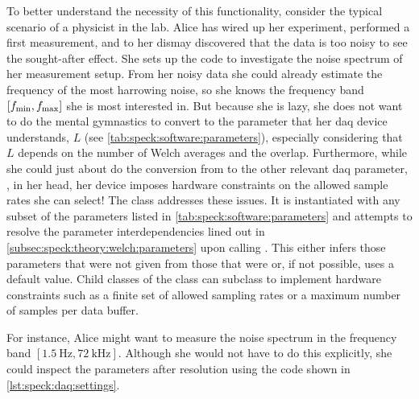 To better understand the necessity of this functionality, consider the typical scenario of a physicist
in the lab.
Alice has wired up her experiment, performed a first measurement, and to her dismay discovered that the data is too noisy to see the sought-after effect.
She sets up the \pyspeck code to investigate the noise spectrum of her measurement setup.
From her noisy data she could already estimate the frequency of the most harrowing noise, so she knows the frequency band $[f_{\mathrm{min}}, f_{\mathrm{max}}]$ she is most interested in.
But because she is lazy,
she does not want to do the mental gymnastics to convert \fmin to the parameter that her \gls{daq} device understands, $L$ (see \cref{tab:speck:software:parameters}), especially considering that $L$ depends on the number of Welch averages and the overlap.
Furthermore, while she could just about do the conversion from \fmax to the other relevant \gls{daq} parameter, \fs, in her head, her device imposes hardware constraints on the allowed sample rates she can select!
The  class addresses these issues.
It is instantiated with any subset of the parameters listed in \cref{tab:speck:software:parameters}
and attempts to resolve the parameter interdependencies lined out in \cref{subsec:speck:theory:welch:parameters} upon calling .
This either infers those parameters that were not given from those that were or, if not possible, uses a default value.
Child classes of the  class can subclass  to implement hardware constraints such as a finite set of allowed sampling rates or a maximum number of samples per data buffer.

For instance, Alice might want to measure the noise spectrum in the frequency band $[\qty{1.5}{\hertz}, \qty{72}{\kilo\hertz}]$.
Although she would not have to do this explicitly,
she could inspect the parameters after resolution using the code shown in \cref{lst:speck:daq:settings}.

